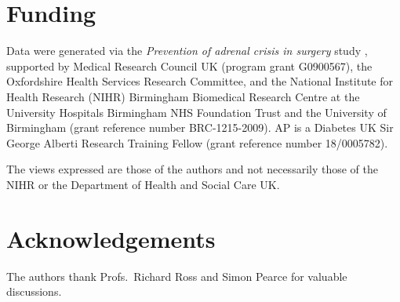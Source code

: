 \documentclass[12pt,a4paper]{article}
\begin{document}
\section*{Funding}
Data were generated via the \emph{Prevention of adrenal crisis in surgery} study \cite{prete2020}, supported by Medical Research Council UK (program grant G0900567), the Oxfordshire Health Services Research Committee, and the National Institute for Health Research  (NIHR)  Birmingham  Biomedical  Research  Centre  at  the  University  Hospitals  Birmingham NHS Foundation Trust and the University of Birmingham (grant reference number BRC-1215-2009). AP is a  Diabetes  UK  Sir  George  Alberti  Research  Training  Fellow  (grant  reference number  18/0005782).

The  views  expressed  are  those  of  the  authors  and  not  necessarily  those  of  the  NIHR  or  the Department  of  Health  and  Social  Care  UK. 

\section*{Acknowledgements}
The authors thank Profs.\ Richard Ross and Simon Pearce for valuable discussions.
\end{document}
